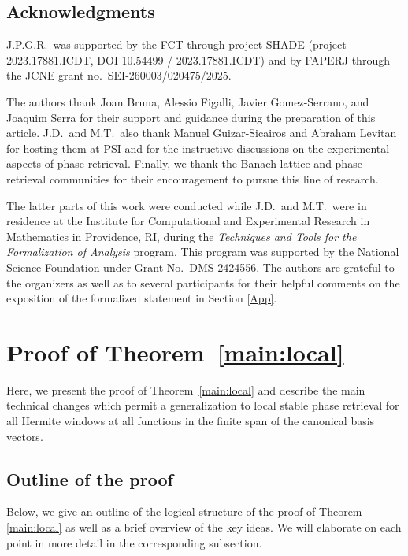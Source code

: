 \documentclass[11pt]{amsart}
\theoremstyle{remark}
\begin{document}
\subsection{Acknowledgments}
J.P.G.R.~was supported by the FCT through project SHADE (project 2023.17881.ICDT, DOI  10.54499 / 2023.17881.ICDT) and by FAPERJ through the JCNE grant no.~SEI-260003/020475/2025.
 \vspace{0.5em}

The authors thank Joan Bruna, Alessio Figalli, Javier Gomez-Serrano, and Joaquim Serra for their support and guidance during the preparation of this article. J.D.~and M.T.~also thank Manuel Guizar-Sicairos and Abraham Levitan for hosting them at PSI and for the instructive discussions on the experimental aspects of phase retrieval. Finally, we thank the Banach lattice and phase retrieval communities for their encouragement to pursue this line of research. 
 \vspace{0.5em}

The latter parts of this work were conducted while J.D.~and M.T.~were in residence at the Institute for Computational and Experimental Research in Mathematics in Providence, RI, during the \emph{Techniques and Tools for the Formalization of Analysis} program. This program was supported by the National Science Foundation under Grant No.~DMS-2424556. The authors are grateful to the organizers as well as to several participants for their helpful comments on the exposition of the formalized statement in Section \ref{App}.

\section{Proof of Theorem~\ref{main:local}}
Here, we present the proof of Theorem~\ref{main:local} and describe the main technical changes which permit a generalization to local stable phase retrieval for all Hermite windows at all functions in the finite span of the canonical basis vectors. 

\subsection{Outline of the proof}\label{sec:strategy}
Below, we give an outline of the logical structure of the proof of Theorem \ref{main:local} as well as a brief overview of the key ideas. We will elaborate on each point in more detail in the corresponding subsection. 
 \vspace{0.5em}
\end{document}
